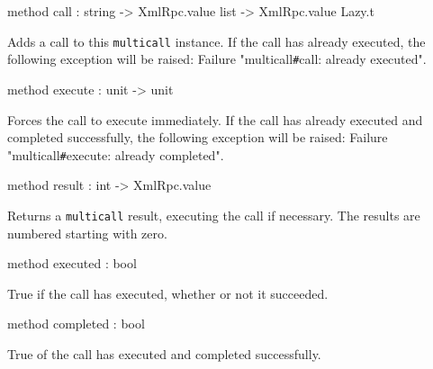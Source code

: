 \documentclass[11pt]{article}
\begin{document}
\begin{ocamldocobjectend}


\label{method:XmlRpc.multicall.call}\begin{ocamldoccode}
method call : string -> XmlRpc.value list -> XmlRpc.value Lazy.t
\end{ocamldoccode}
\begin{ocamldocdescription}
Adds a call to this {\tt{multicall}} instance.
      If the call has already executed, the following exception will
      be raised:
      Failure "multicall\verb`#`call: already executed".


\end{ocamldocdescription}


\label{method:XmlRpc.multicall.execute}\begin{ocamldoccode}
method execute : unit -> unit
\end{ocamldoccode}
\begin{ocamldocdescription}
Forces the call to execute immediately.
      If the call has already executed and completed successfully, the
      following exception will be raised:
      Failure "multicall\verb`#`execute: already completed".


\end{ocamldocdescription}


\label{method:XmlRpc.multicall.result}\begin{ocamldoccode}
method result : int -> XmlRpc.value
\end{ocamldoccode}
\begin{ocamldocdescription}
Returns a {\tt{multicall}} result, executing the call if necessary.
      The results are numbered starting with zero.


\end{ocamldocdescription}


\label{method:XmlRpc.multicall.executed}\begin{ocamldoccode}
method executed : bool
\end{ocamldoccode}
\begin{ocamldocdescription}
True if the call has executed, whether or not it succeeded.


\end{ocamldocdescription}


\label{method:XmlRpc.multicall.completed}\begin{ocamldoccode}
method completed : bool
\end{ocamldoccode}
\begin{ocamldocdescription}
True of the call has executed and completed successfully.


\end{ocamldocdescription}
\end{ocamldocobjectend}
\end{document}
